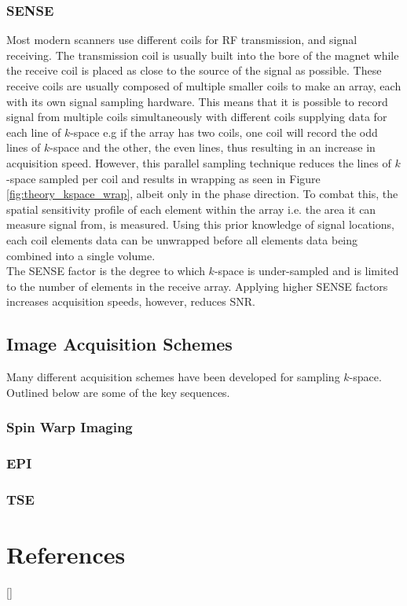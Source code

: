 \subsubsection{\ac*{SENSE}}
Most modern scanners use different coils for \ac{RF} transmission, and signal receiving. The transmission coil is usually built into the bore of the magnet while the receive coil is placed as close to the source of the signal as possible. These receive coils are usually composed of multiple smaller coils to make an array, each with its own signal sampling hardware. This means that it is possible to record signal from multiple coils simultaneously with different coils supplying data for each line of $k$-space e.g if the array has two coils, one coil will record the odd lines of $k$-space and the other, the even lines, thus resulting in an increase in acquisition speed. However, this parallel sampling technique reduces the lines of $k$-space sampled per coil and results in wrapping as seen in Figure \ref{fig:theory_kspace_wrap}, albeit only in the phase direction. To combat this, the spatial sensitivity profile of each element within the array i.e. the area it can measure signal from, is measured. Using this prior knowledge of signal locations, each coil elements data can be unwrapped before all elements data being combined into a single volume.\\

The \ac{SENSE} factor is the degree to which $k$-space is under-sampled and is limited to the number of elements in the receive array. Applying higher \ac{SENSE} factors increases acquisition speeds, however, reduces \ac{SNR}.

\subsection{Image Acquisition Schemes}

Many different acquisition schemes have been developed for sampling $k$-space. Outlined below are some of the key sequences.

\subsubsection{Spin Warp Imaging}

\subsubsection{\ac*{EPI}}

\subsubsection{\ac*{TSE}}

\newpage
\section{References}
[\refname]{}
\printbibliography